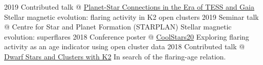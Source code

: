 \documentclass[9.5pt]{k-cv} %
\begin{document}
\begin{entrylist}
\entry
{2019}
{Contributed talk @ \href{https://www.kitp.ucsb.edu/activities/exostar-c19}{Planet-Star Connections in the Era of TESS and Gaia}}
{}%
{Stellar magnetic evolution: flaring activity in K2 open clusters}
\entry
{2019}
{Seminar talk @ Centre for Star and Planet Formation (STARPLAN)}
{}%
{Stellar magnetic evolution: superflares}
\entry
{2018}
{Conference poster @ \href{http://coolstars20.cfa.harvard.edu/}{CoolStars20}}
{}%
{Exploring flaring activity as an age indicator using open cluster data}
\entry
{2018}
{Contributed talk @ \href{https://keplergo.github.io/KeplerScienceWebsite/workshop-on-dwarf-stars-and-clusters-with-k2-registration-now-open-space-is-limited.html}{Dwarf Stars and Clusters with K2}}
{}%
{In search of the flaring-age relation.}
\end{entrylist}


%




\newpage
\end{document}
